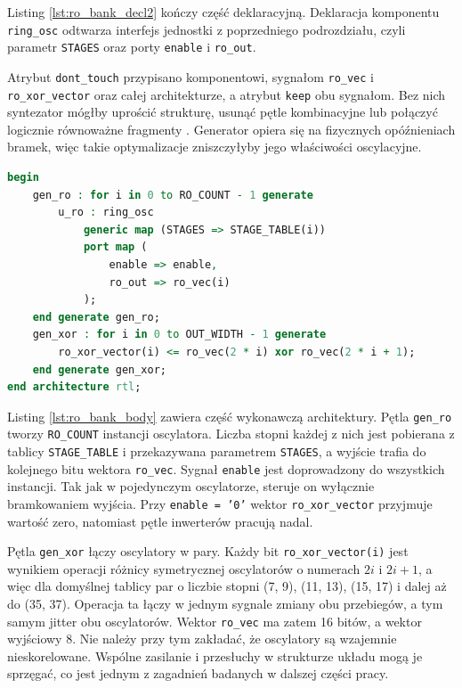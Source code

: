 Listing \ref{lst:ro_bank_decl2} kończy część deklaracyjną. Deklaracja
komponentu \texttt{ring\_osc} odtwarza interfejs jednostki z poprzedniego
podrozdziału, czyli parametr \texttt{STAGES} oraz porty \texttt{enable}
i \texttt{ro\_out}.

Atrybut \texttt{dont\_touch} przypisano komponentowi, sygnałom
\texttt{ro\_vec} i \texttt{ro\_xor\_vector} oraz całej architekturze,
a atrybut \texttt{keep} obu sygnałom. Bez nich syntezator mógłby uprościć
strukturę, usunąć pętle kombinacyjne lub połączyć logicznie równoważne
fragmenty \cite{amd_vivado_donttouch,amd_vivado_keep}. Generator opiera się na
fizycznych opóźnieniach bramek, więc takie optymalizacje zniszczyłyby jego
właściwości oscylacyjne.

\begin{lstlisting}[language=VHDL,
caption={Instancje oscylatorów i operacja XOR w architekturze \texttt{ro\_bank} (\texttt{ro\_bank.vhdl})},
label={lst:ro_bank_body}]
begin
    gen_ro : for i in 0 to RO_COUNT - 1 generate
        u_ro : ring_osc
            generic map (STAGES => STAGE_TABLE(i))
            port map (
                enable => enable,
                ro_out => ro_vec(i)
            );
    end generate gen_ro;
    gen_xor : for i in 0 to OUT_WIDTH - 1 generate
        ro_xor_vector(i) <= ro_vec(2 * i) xor ro_vec(2 * i + 1);
    end generate gen_xor;
end architecture rtl;
\end{lstlisting}

Listing \ref{lst:ro_bank_body} zawiera część wykonawczą architektury. Pętla
\texttt{gen\_ro} tworzy \texttt{RO\_COUNT} instancji oscylatora. Liczba stopni
każdej z nich jest pobierana z tablicy \texttt{STAGE\_TABLE} i przekazywana
parametrem \texttt{STAGES}, a wyjście trafia do kolejnego bitu wektora
\texttt{ro\_vec}. Sygnał \texttt{enable} jest doprowadzony do wszystkich
instancji. Tak jak w pojedynczym oscylatorze, steruje on wyłącznie
bramkowaniem wyjścia. Przy \texttt{enable = '0'} wektor
\texttt{ro\_xor\_vector} przyjmuje wartość zero, natomiast pętle inwerterów
pracują nadal.

Pętla \texttt{gen\_xor} łączy oscylatory w pary. Każdy bit
\texttt{ro\_xor\_vector(i)} jest wynikiem operacji różnicy symetrycznej
oscylatorów o numerach $2i$ i $2i+1$, a więc dla domyślnej tablicy par
o liczbie stopni (7, 9), (11, 13), (15, 17) i dalej aż do (35, 37).
Operacja ta łączy w jednym sygnale zmiany obu przebiegów, a tym samym jitter
obu oscylatorów. Wektor \texttt{ro\_vec} ma zatem 16 bitów, a wektor
wyjściowy 8. Nie należy przy tym zakładać, że oscylatory są wzajemnie
nieskorelowane. Wspólne zasilanie i przesłuchy w strukturze układu mogą je
sprzęgać, co jest jednym z zagadnień badanych w dalszej części pracy.

